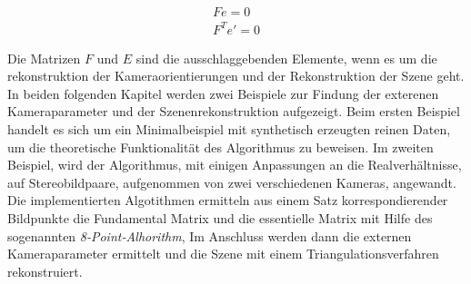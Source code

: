 \begin{gather}
Fe = 0\\
F^Te' = 0
\end{gather}

Die Matrizen $F$ und $E$ sind die ausschlaggebenden Elemente, wenn es um die rekonstruktion der Kameraorientierungen und der Rekonstruktion der Szene geht. In beiden folgenden Kapitel werden zwei Beispiele zur Findung der exterenen Kameraparameter und der Szenenrekonstruktion aufgezeigt. Beim ersten Beispiel handelt es sich um ein Minimalbeispiel mit synthetisch erzeugten reinen Daten, um die theoretische Funktionalität des Algorithmus zu beweisen. Im zweiten Beispiel, wird der Algorithmus, mit einigen Anpassungen an die Realverhältnisse, auf Stereobildpaare, aufgenommen von zwei verschiedenen Kameras, angewandt. Die implementierten Algotithmen ermitteln aus einem Satz korrespondierender Bildpunkte die Fundamental Matrix und die essentielle Matrix mit Hilfe des sogenannten \textit{8-Point-Alhorithm}, Im Anschluss werden dann die externen Kameraparameter ermittelt und die Szene mit einem Triangulationsverfahren rekonstruiert. 

